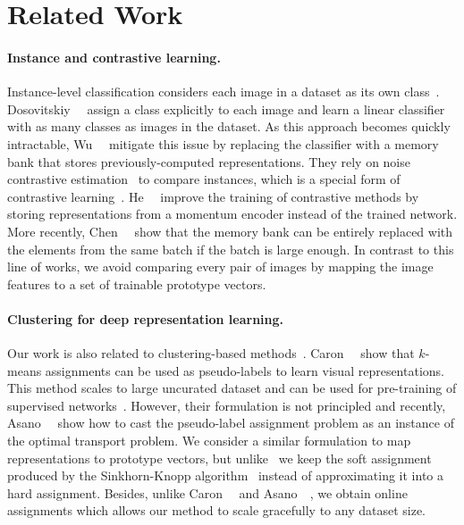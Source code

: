 
\section{Related Work}
\label{sec:related}

\paragraph{Instance and contrastive learning.}
Instance-level classification considers each image in a dataset as its own class~\cite{bojanowski2017unsupervised,dosovitskiy2016discriminative,wu2018unsupervised}.
Dosovitskiy~\etal~\cite{dosovitskiy2016discriminative} assign a class explicitly to each image and learn a linear classifier with as many classes as images in the dataset.
As this approach becomes quickly intractable, Wu~\etal~\cite{wu2018unsupervised} mitigate this issue by replacing the classifier with a memory bank that stores previously-computed representations.
They rely on noise contrastive estimation~\cite{gutmann2010noise} to compare instances, which is a special form of contrastive learning~\cite{hjelm2018learning,oord2018representation}.
He~\etal~\cite{he2019momentum} improve the training of contrastive methods by storing representations from a momentum encoder instead of the trained network.
More recently, Chen~\etal~\cite{chen2020simple} show that the memory bank can be entirely replaced with the elements from the same batch if the batch is large enough.
In contrast to this line of works, we avoid comparing every pair of images by mapping the image features to a set of trainable prototype vectors.

\paragraph{Clustering for deep representation learning.}
Our work is also related to clustering-based methods~\cite{asano2019self,bautista2016cliquecnn,caron2018deep,caron2019unsupervised,huang2019unsupervised,xie2016unsupervised,yang2016joint,zhuang2019local,gidaris2020learning,yan2020cluster}.
Caron~\etal~\cite{caron2018deep} show that $k$-means assignments can be used as pseudo-labels to learn visual representations.
This method scales to large uncurated dataset and can be used for pre-training of supervised networks~\cite{caron2019unsupervised}.
However, their formulation is not principled and recently, Asano~\etal~\cite{asano2019self} show how to cast the pseudo-label assignment problem as an instance of the optimal transport problem.
We consider a similar formulation to map representations to prototype vectors, but unlike~\cite{asano2019self} we keep the soft assignment produced by the Sinkhorn-Knopp algorithm~\cite{cuturi2013sinkhorn} instead of approximating it into a hard assignment.
Besides, unlike Caron~\etal~\cite{caron2018deep,caron2019unsupervised} and Asano~\etal~\cite{asano2019self}, we obtain online assignments which allows our method to scale gracefully to any dataset size.

